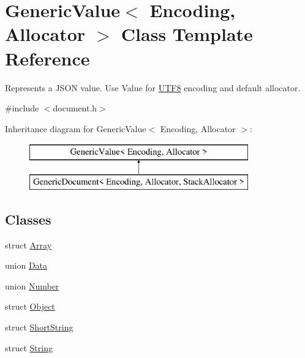 \hypertarget{class_generic_value}{}\section{Generic\+Value$<$ Encoding, Allocator $>$ Class Template Reference}
\label{class_generic_value}


Represents a J\+S\+O\+N value. Use Value for \hyperlink{struct_u_t_f8}{U\+T\+F8} encoding and default allocator.  




{\ttfamily \#include $<$document.\+h$>$}

Inheritance diagram for Generic\+Value$<$ Encoding, Allocator $>$\+:\begin{figure}[H]
\begin{center}
\leavevmode
\includegraphics[height=2.000000cm]{class_generic_value}
\end{center}
\end{figure}
\subsection*{Classes}
\begin{DoxyCompactItemize}
\item 
struct \hyperlink{struct_generic_value_1_1_array}{Array}
\item 
union \hyperlink{union_generic_value_1_1_data}{Data}
\item 
union \hyperlink{union_generic_value_1_1_number}{Number}
\item 
struct \hyperlink{struct_generic_value_1_1_object}{Object}
\item 
struct \hyperlink{struct_generic_value_1_1_short_string}{Short\+String}
\item 
struct \hyperlink{struct_generic_value_1_1_string}{String}
\end{DoxyCompactItemize}

